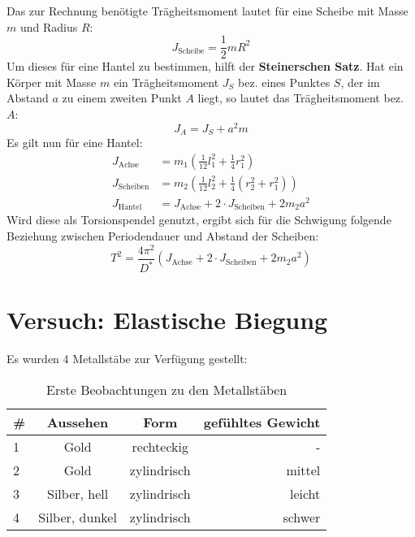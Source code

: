 Das zur Rechnung benötigte Trägheitsmoment lautet für eine Scheibe mit Masse $m$ und Radius $R$:
\begin{equation}
  J_{\text{Scheibe}}=\frac{1}{2}mR^2
  \label{eq:j_scheibe}
\end{equation}
Um dieses für eine Hantel zu bestimmen, hilft der \textbf{Steinerschen Satz}. Hat ein Körper mit Masse $m$ ein Trägheitsmoment $J_S$ bez. eines Punktes $S$, der im Abstand $a$ zu einem zweiten Punkt $A$ liegt, so lautet das Trägheitsmoment bez. $A$:
\begin{equation}
  J_A=J_S+a^2m
  \label{eq:steiner}
\end{equation}
Es gilt nun für eine Hantel:
\begin{align}
  J_{\text{Achse}}&=m_1\left( \frac{1}{12}l_1^2+\frac{1}{4}r_1^2 \right) \\
  J_{\text{Scheiben}}&=m_2\left(\frac{1}{12}l_2^2+\frac{1}{4}(r_2^2+r_1^2)\right) \\
  J_{\text{Hantel}}&=J_{\text{Achse}}+2\cdot J_{\text{Scheiben}}+2m_2a^2
  \label{eq:hantel}
\end{align}
Wird diese als Torsionspendel genutzt, ergibt sich für die Schwigung folgende Beziehung zwischen Periodendauer und Abstand der Scheiben:
\begin{equation}
  T^2=\frac{4\pi^2}{D^*}(J_{\text{Achse}}+2\cdot J_{\text{Scheiben}}+2m_2a^2)
  \label{eq:hanteldauer}
\end{equation}
\section{Versuch: Elastische Biegung}
Es wurden 4 Metallstäbe zur Verfügung gestellt:
\begin{table}[h]
  \centering
  \begin{tabular}{l | c | c | r}
    \# & Aussehen & Form & gefühltes Gewicht \\ \hline
    1 & Gold & rechteckig & - \\
    2 & Gold & zylindrisch & mittel \\
    3 & Silber, hell & zylindrisch & leicht \\
    4 & Silber, dunkel & zylindrisch & schwer
  \end{tabular}
  \caption{Erste Beobachtungen zu den Metallstäben}
  \label{tab:metall_beob}
\end{table}

